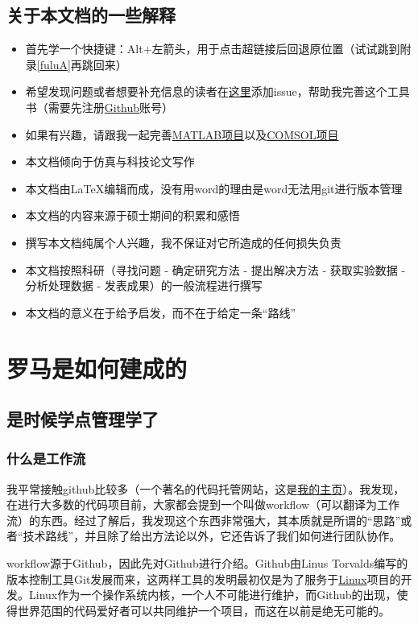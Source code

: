 \documentclass[UTF8,oneside]{ctexbook}
\begin{document}
\section{关于本文档的一些解释}
\begin{itemize}
	\item 首先学一个快捷键：Alt+左箭头，用于点击超链接后回退原位置（试试跳到附录\ref{fuluA}再跳回来）
	\item 希望发现问题或者想要补充信息的读者在\href{https://github.com/lonelybag/Latex_lonelybag/issues}{这里}添加issue，帮助我完善这个工具书（需要先注册\href{https://github.com}{Github}账号）
	\item 如果有兴趣，请跟我一起完善\href{https://github.com/lonelybag/MATLAB_DEMO}{MATLAB项目}以及\href{https://github.com/lonelybag/Comsol_lonelybag}{COMSOL项目}
	\item 本文档倾向于仿真与科技论文写作
	\item 本文档由\LaTeX 编辑而成，没有用word的理由是word无法用git进行版本管理
	\item 本文档的内容来源于硕士期间的积累和感悟
	\item 撰写本文档纯属个人兴趣，我不保证对它所造成的任何损失负责
	\item 本文档按照科研（寻找问题 - 确定研究方法 - 提出解决方法 - 获取实验数据 - 分析处理数据 - 发表成果）的一般流程进行撰写
	\item 本文档的意义在于给予启发，而不在于给定一条“路线”
\end{itemize}

\chapter{罗马是如何建成的}
\section{是时候学点管理学了}
\subsection{什么是工作流}
我平常接触github比较多（一个著名的代码托管网站，这是\href{https://github.com/lonelybag?tab=repositories}{我的主页}）。我发现，在进行大多数的代码项目前，大家都会提到一个叫做workflow（可以翻译为工作流）的东西。经过了解后，我发现这个东西非常强大，其本质就是所谓的“思路”或者“技术路线”，并且除了给出方法论以外，它还告诉了我们如何进行团队协作。

workflow源于Github，因此先对Github进行介绍。Github由Linus Torvalds编写的版本控制工具Git发展而来，这两样工具的发明最初仅是为了服务于\href{https://github.com/torvalds/linux}{Linux}项目的开发。Linux作为一个操作系统内核，一个人不可能进行维护，而Github的出现，使得世界范围的代码爱好者可以共同维护一个项目，而这在以前是绝无可能的。
\end{document}

